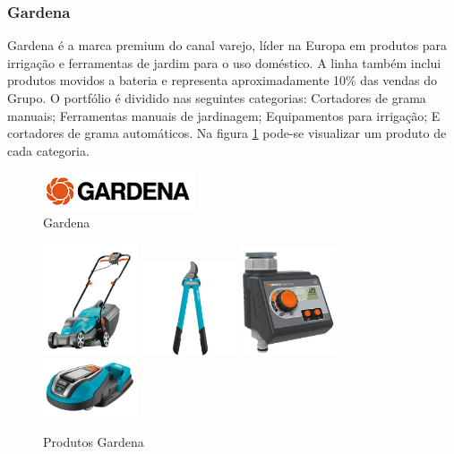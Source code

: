 \documentclass[12pt]{article}
\begin{document}
\subsubsection{Gardena}

	Gardena é a marca premium do canal varejo, líder na Europa em produtos para irrigação e ferramentas de jardim para o uso doméstico. A linha também inclui produtos movidos a bateria e representa aproximadamente 10\% das vendas do Grupo. O portfólio é dividido nas seguintes categorias: Cortadores de grama manuais; Ferramentas manuais de jardinagem; Equipamentos para irrigação; E cortadores de grama automáticos. Na figura \ref{fig:gardena-prod} pode-se visualizar um produto de cada categoria.

\begin{figure}[h!]
	\centering
	\includegraphics[width=0.4\textwidth]{img/logo-gardena.png}
	\caption{Gardena}
\end{figure}

\begin{figure}[h!]
	\centering
	\includegraphics[width=0.25\textwidth]{img/products/gardena2.jpg}
	\includegraphics[width=0.25\textwidth]{img/products/gardena3.jpg}
	\includegraphics[width=0.25\textwidth]{img/products/gardena4.jpg}
	\\	
	\includegraphics[width=0.25\textwidth]{img/products/gardena1.jpg}
	\caption{Produtos Gardena}
	\label{fig:gardena-prod}
\end{figure}
\end{document}
